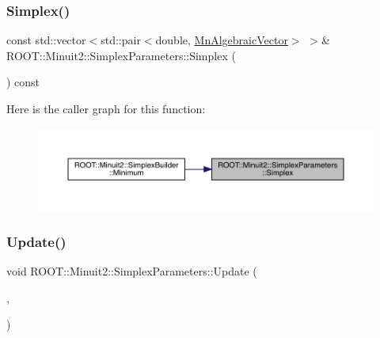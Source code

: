 \subsubsection{\texorpdfstring{Simplex()}{Simplex()}\hspace{0.1cm}{\footnotesize\ttfamily [2/2]}}
{\footnotesize\ttfamily const std\+::vector$<$std\+::pair$<$double, \mbox{\hyperlink{namespaceROOT_1_1Minuit2_a62ed97730a1ca8d3fbaec64a19aa11c9}{Mn\+Algebraic\+Vector}}$>$ $>$\& R\+O\+O\+T\+::\+Minuit2\+::\+Simplex\+Parameters\+::\+Simplex (\begin{DoxyParamCaption}{ }\end{DoxyParamCaption}) const\hspace{0.3cm}{\ttfamily [inline]}}

Here is the caller graph for this function\+:\nopagebreak
\begin{figure}[H]
\begin{center}
\leavevmode
\includegraphics[width=350pt]{d7/da2/classROOT_1_1Minuit2_1_1SimplexParameters_a873b8883c6932b879348e73d36d86afb_icgraph}
\end{center}
\end{figure}
\mbox{\label{classROOT_1_1Minuit2_1_1SimplexParameters_aa9536cc9c7754ce308160d5e456ac54f}} 
\subsubsection{\texorpdfstring{Update()}{Update()}\hspace{0.1cm}{\footnotesize\ttfamily [1/2]}}
{\footnotesize\ttfamily void R\+O\+O\+T\+::\+Minuit2\+::\+Simplex\+Parameters\+::\+Update (\begin{DoxyParamCaption}\item[{double}]{,  }\item[{const \mbox{\hyperlink{namespaceROOT_1_1Minuit2_a62ed97730a1ca8d3fbaec64a19aa11c9}{Mn\+Algebraic\+Vector}} \&}]{ }\end{DoxyParamCaption})}

